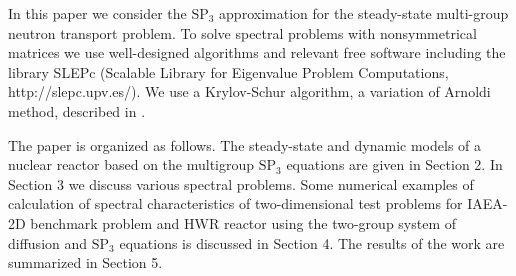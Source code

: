 \documentclass[authoryear]{elsarticle}
\begin{document}
In this paper we consider the $\mathrm{SP_3}$ approximation for the steady-state multi-group neutron transport problem.
To solve spectral problems with nonsymmetrical matrices we use well-designed algorithms and relevant free software including the library SLEPc (Scalable Library for Eigenvalue Problem Computations, http://slepc.upv.es/). 
We use a Krylov-Schur algorithm, a variation of Arnoldi method, described in \citep{stewart2002krylov}.

The paper is organized as follows. 
The steady-state and dynamic models of a nuclear reactor based on the multigroup $\mathrm{SP_3}$ equations are given in Section 2. 
In Section 3 we discuss various spectral problems. 
Some numerical examples of calculation of spectral characteristics of two-dimensional test problems for IAEA-2D benchmark problem and HWR reactor using the two-group system of diffusion and $\mathrm{SP_3}$ equations is discussed in Section 4. 
The results of the work are summarized in Section 5.
\end{document}
